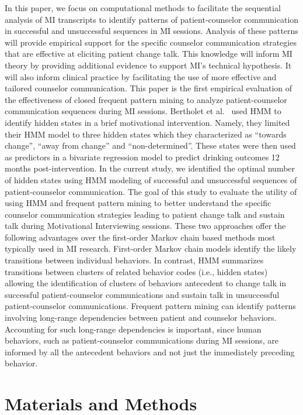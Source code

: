 In this paper, we focus on computational methods to facilitate the sequential analysis of MI transcripts to identify patterns of patient-counselor communication in successful and unsuccessful sequences in MI sessions. Analysis of these patterns will provide empirical support for the specific counselor communication strategies that are effective at eliciting patient change talk. This knowledge will inform MI theory by providing additional evidence to support MI's technical hypothesis. It will also inform clinical practice by facilitating the use of more effective and tailored counselor communication. This paper is the first empirical evaluation of the effectiveness of closed frequent pattern mining to analyze patient-counselor communication sequences during MI sessions. Bertholet et al.~\cite{bertholet2010change} used HMM to identify hidden states in a brief motivational intervention. Namely, they limited their HMM model to three hidden states which they characterized as ``towards change'', ``away from change'' and ``non-determined''. These states were then used as predictors in a bivariate regression model to predict drinking outcomes 12 months post-intervention. In the current study, we identified the optimal number of hidden states using HMM modeling of successful and unsuccessful sequences of patient-counselor communication. The goal of this study to evaluate the utility of using HMM and frequent pattern mining to better understand the specific counselor communication strategies leading to patient change talk and sustain talk during Motivational Interviewing sessions. These two approaches offer the following advantages over the first-order Markov chain based methods most typically used in MI research. First-order Markov chain models identify the likely transitions between individual behaviors. In contrast, HMM summarizes transitions between clusters of related behavior codes (i.e., hidden states) allowing the identification of clusters of behaviors antecedent to change talk in successful patient-counselor communications and sustain talk in unsuccessful patient-counselor communications. Frequent pattern mining can identify patterns involving long-range dependencies between patient and counselor behaviors. Accounting for such long-range dependencies is important, since human behaviors, such as patient-counselor communications during MI sessions, are informed by all the antecedent behaviors and not just the immediately preceding behavior.

\section{Materials and Methods}
\label{sec:materialsAndMethods}

